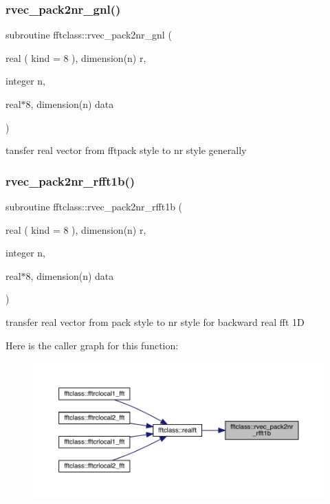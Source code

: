 \subsubsection{\texorpdfstring{rvec\_pack2nr\_gnl()}{rvec\_pack2nr\_gnl()}}
{\footnotesize\ttfamily subroutine fftclass\+::rvec\+\_\+pack2nr\+\_\+gnl (\begin{DoxyParamCaption}\item[{real ( kind = 8 ), dimension(n)}]{r,  }\item[{integer}]{n,  }\item[{real$\ast$8, dimension(n)}]{data }\end{DoxyParamCaption})}



tansfer real vector from fftpack style to nr style generally 

\mbox{\label{namespacefftclass_a49a850047c36eff6fb6d5eb1669cb009}} 
\subsubsection{\texorpdfstring{rvec\_pack2nr\_rfft1b()}{rvec\_pack2nr\_rfft1b()}}
{\footnotesize\ttfamily subroutine fftclass\+::rvec\+\_\+pack2nr\+\_\+rfft1b (\begin{DoxyParamCaption}\item[{real ( kind = 8 ), dimension(n)}]{r,  }\item[{integer}]{n,  }\item[{real$\ast$8, dimension(n)}]{data }\end{DoxyParamCaption})}



transfer real vector from pack style to nr style for backward real fft 1D 

Here is the caller graph for this function\+:\nopagebreak
\begin{figure}[H]
\begin{center}
\leavevmode
\includegraphics[width=350pt]{namespacefftclass_a49a850047c36eff6fb6d5eb1669cb009_icgraph}
\end{center}
\end{figure}
\mbox{\label{namespacefftclass_ac898bf50e64ca8c43e8d9fa0c2c85919}} 
